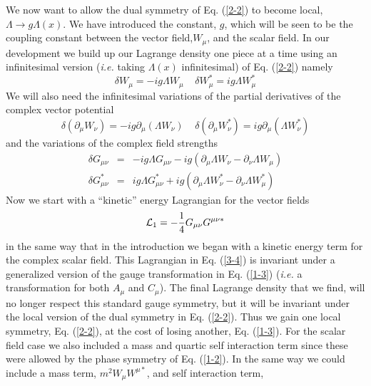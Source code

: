 \documentclass[a4paper,aps]{revtex4}
\begin{document}
We now want to allow the dual symmetry of Eq. (\ref{2-2}) to become
local, $\Lambda \rightarrow g \Lambda (x)$. We have introduced the
constant, $g$, which will be seen to be the coupling constant
between the vector field,$W_{\mu}$, and the scalar field.
In our development we build up our Lagrange density one piece
at a time using an infinitesimal version ({\it i.e.} taking
$\Lambda (x)$ infinitesimal) of
Eq. (\ref{2-2}) namely
\begin{equation}
\label{3-1}
\delta W_{\mu} =-i g \Lambda W_{\mu}
\; \; \; \;
\delta W_{\mu} ^{\ast} = i g \Lambda W_{\mu } ^{\ast}
\end{equation}
We will also need the infinitesimal variations of the
partial derivatives of the complex vector potential
\begin{equation}
\label{3-2}
\delta (\partial _{\mu} W_{\nu}) =-i g \partial _{\mu} (\Lambda W_{\nu})
\; \; \; \;
\delta (\partial _{\mu} W_{\nu} ^{\ast}) =
i g \partial_{\mu} (\Lambda  W_{\nu } ^{\ast} )
\end{equation}
and the variations of the complex field strengths
\begin{eqnarray}
\label{3-3}
\delta G_{\mu \nu} &=& 
-i g \Lambda G_{\mu \nu} -ig (\partial _{\mu} \Lambda W_{\nu}
-\partial _{\nu} \Lambda W_{\mu})
\nonumber \\
\delta G_{\mu \nu} ^{\ast} &=& 
i g \Lambda G_{\mu \nu} ^{\ast} + ig (\partial _{\mu} \Lambda
W_{\nu} ^{\ast} -\partial _{\nu} \Lambda W_{\mu}^{\ast})
\end{eqnarray}
Now we start with a ``kinetic'' energy Lagrangian for the
vector fields
\begin{equation}
\label{3-4}
{\cal L} _1 = -\frac{1}{4} G_{\mu \nu} G^{\mu \nu \ast}
\end{equation}
in the same way that in the introduction we began with
a kinetic energy term for the complex scalar field.
This Lagrangian in Eq. (\ref{3-4}) is invariant under a generalized
version of the gauge transformation in Eq. (\ref{1-3}) ({\it i.e.}
a transformation for both $A_{\mu}$ and $C_{\mu}$). The final
Lagrange density that we find, will no longer respect this
standard gauge symmetry, but it will be invariant under the
local version of the dual symmetry in Eq. (\ref{2-2}). Thus
we gain one local symmetry, Eq. (\ref{2-2}), at the cost of
losing another, Eq. (\ref{1-3}). For
the scalar field case we also included a mass and quartic
self interaction term since these were allowed by the phase
symmetry of Eq. (\ref{1-2}). In the same way we could include
a mass term, $m^2 W_{\mu} W^{\mu \ast}$, and self interaction term,
\end{document}
